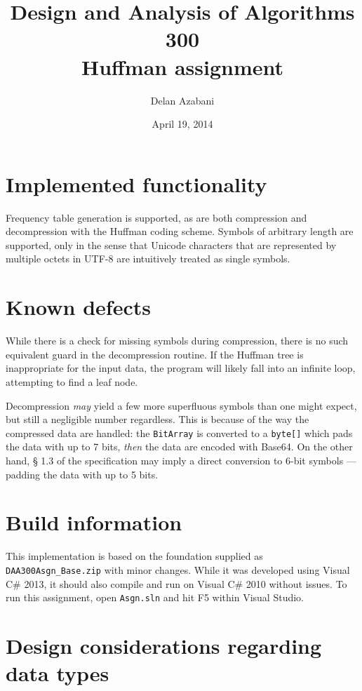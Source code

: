 \documentclass[a4paper,12pt]{article}
\title{Design and Analysis of Algorithms 300\\Huffman assignment}
\date{April 19, 2014}
\author{Delan Azabani}
\begin{document}
\maketitle

\section{Implemented functionality}

Frequency table generation is supported, as are both compression and
decompression with the Huffman coding scheme. Symbols of arbitrary length are
supported, only in the sense that Unicode characters that are represented by
multiple octets in UTF-8 are intuitively treated as single symbols.

\section{Known defects}

While there is a check for missing symbols during compression, there is no such
equivalent guard in the decompression routine. If the Huffman tree is
inappropriate for the input data, the program will likely fall into an infinite
loop, attempting to find a leaf node.

Decompression \emph{may} yield a few more superfluous symbols than one might
expect, but still a negligible number regardless. This is because of the way
the compressed data are handled: the \texttt{BitArray} is converted to a
\texttt{byte[]} which pads the data with up to 7 bits, \emph{then} the data are
encoded with Base64. On the other hand, § 1.3 of the specification may imply a
direct conversion to 6-bit symbols --- padding the data with up to 5 bits.

\section{Build information}

This implementation is based on the foundation supplied as
\texttt{DAA300Asgn\_Base.zip} with minor changes. While it was developed using
Visual C\# 2013, it should also compile and run on Visual C\# 2010 without
issues. To run this assignment, open \texttt{Asgn.sln} and hit F5 within Visual
Studio.

\newpage

\section{Design considerations regarding data types}
\end{document}
